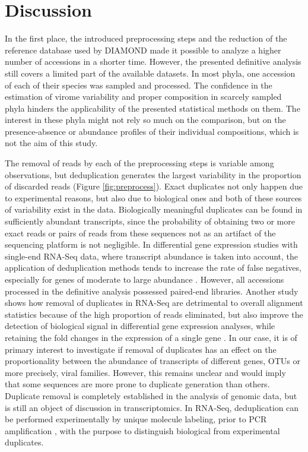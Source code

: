 \documentclass[
  openany]{book}
\begin{document}
\hypertarget{discussion}{%
\section{Discussion}\label{discussion}}

In the first place, the introduced preprocessing steps and the reduction of the reference database used by DIAMOND made it possible to analyze a higher number of accessions in a shorter time. However, the presented definitive analysis still covers a limited part of the available datasets. In most phyla, one accession of each of their species was sampled and processed. The confidence in the estimation of virome variability and proper composition in scarcely sampled phyla hinders the applicability of the presented statistical methods on them. The interest in these phyla might not rely so much on the comparison, but on the presence-absence or abundance profiles of their individual compositions, which is not the aim of this study.

The removal of reads by each of the preprocessing steps is variable among observations, but deduplication generates the largest variability in the proportion of discarded reads (Figure \ref{fig:preprocess}). Exact duplicates not only happen due to experimental reasons, but also due to biological ones and both of these sources of variability exist in the data. Biologically meaningful duplicates can be found in sufficiently abundant transcripts, since the probability of obtaining two or more exact reads or pairs of reads from these sequences not as an artifact of the sequencing platform is not negligible. In differential gene expression studies with single-end RNA-Seq data, where transcript abundance is taken into account, the application of deduplication methods tends to increase the rate of false negatives, especially for genes of moderate to large abundance \autocite{Klepikova2017}. However, all accessions processed in the definitive analysis possessed paired-end libraries. Another study shows how removal of duplicates in RNA-Seq are detrimental to overall alignment statistics because of the high proportion of reads eliminated, but also improve the detection of biological signal in differential gene expression analyses, while retaining the fold changes in the expression of a single gene \autocite{Dozmorov2015}. In our case, it is of primary interest to investigate if removal of duplicates has an effect on the proportionality between the abundance of transcripts of different genes, OTUs or more precisely, viral families. However, this remains unclear and would imply that some sequences are more prone to duplicate generation than others. Duplicate removal is completely established in the analysis of genomic data, but is still an object of discussion in transcriptomics. In RNA-Seq, deduplication can be performed experimentally by unique molecule labeling, prior to PCR amplification \autocite{Fu2018}, with the purpose to distinguish biological from experimental duplicates.
\end{document}
